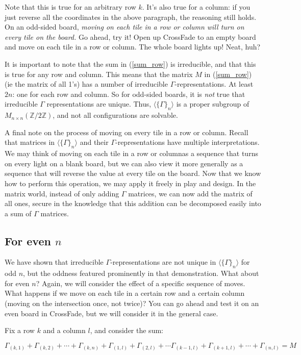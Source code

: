 \documentclass{article}[12pt]
\newcommand{\gen}[2]{\Gamma_{(#1,#2)}}
\newcommand{\group}[1]{M_{#1 \times #1}(\mathbb{Z}/2\mathbb{Z})}
\newcommand{\subgroup}[1]{\langle\{\Gamma\}_{#1}\rangle}
\newcommand{\refx}[1]{(\ref{#1})}
\begin{document}
Note that this is true for an arbitrary row $k$.  It's also true for a column: if you just reverse all the coordinates in the above paragraph, the reasoning still holds.  On an odd-sided board, \emph{moving on each tile in a row or column will turn on every tile on the board.}  Go ahead, try it!  Open up CrossFade to an empty board and move on each tile in a row or column.  The whole board lights up!  Neat, huh?

It is important to note that the sum in \refx{sum_row} is irreducible, and that this is true for any row and column.  This means that the matrix $M$ in \refx{sum_row} (ie the matrix of all 1's) has a number of irreducible $\Gamma$-representations.  At least $2n$: one for each row and column.  So for odd-sided boards, it is \emph{not} true that irreducible $\Gamma$ representations are unique.  Thus, $\subgroup{n}$ is a proper subgroup of $\group{n}$, and not all configurations are solvable.

A final note on the process of moving on every tile in a row or column.  Recall that matrices in $\subgroup{n}$ and their $\Gamma$-representations have multiple interpretations.  We may think of moving on each tile in a row or columnas a sequence that turns on every light on a blank board, but we can also view it more generally as a sequence that will reverse the value at every tile on the board.  Now that we know how to perform this operation, we may apply it freely in play and design.  In the matrix world, instead of only adding $\Gamma$ matrices, we can now add the matrix of all ones, secure in the knowledge that this addition can be decomposed easily into a sum of $\Gamma$ matrices.

\subsection{For even $n$}

We have shown that irreducible $\Gamma$-representations are not unique in $\subgroup{n}$ for odd $n$, but the oddness featured prominently in that demonstration.  What about for even $n$?  Again, we will consider the effect of a specific sequence of moves.  What happens if we move on each tile in a certain row and a certain column (moving on the intersection once, not twice)?  You can go ahead and test it on an even board in CrossFade, but we will consider it in the general case.

Fix a row $k$ and a column $l$, and consider the sum:

\begin{equation}
\label{sum_row_and_col}
\gen{k}{1} + \gen{k}{2} + \cdots + \gen{k}{n} + \gen{1}{l} + \gen{2}{l} + \cdots \gen{k - 1}{l} + \gen{k + 1}{l} + \cdots + \gen{n}{l} = M
\end{equation}
\end{document}
